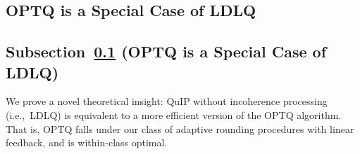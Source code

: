 \newcommand{\titleOptqEquiv}{OPTQ is a Special Case of LDLQ}
\subsection{\titleOptqEquiv}\label{secOPTQequiv}
\begin{toappendix}
\subsection*{Subsection~\ref{secOPTQequiv} (\titleOptqEquiv)}
\end{toappendix}
We prove a novel theoretical insight: QuIP without incoherence processing (i.e.,~LDLQ) is equivalent to a more efficient version of the OPTQ algorithm. %
That is, OPTQ falls under our class of adaptive rounding procedures with linear feedback, and is within-class optimal. 

